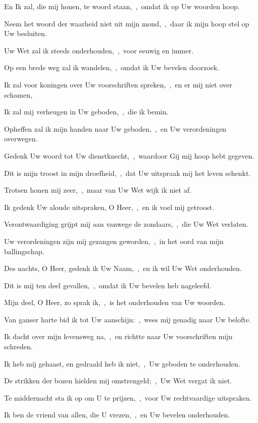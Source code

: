 \documentclass[12pt,twoside,a5paper]{article}
\begin{document}
\begin{halfparskip}
  En Ik zal, die mij honen, te woord staan,~\sep\ omdat ik op Uw woorden hoop.

  Neem het woord der waarheid niet uit mijn mond,~\sep\ daar ik mijn hoop stel op Uw besluiten.

  Uw Wet zal ik steeds onderhouden,~\sep\ voor eeuwig en immer.

  Op een brede weg zal ik wandelen,~\sep\ omdat ik Uw bevelen doorzoek.

  Ik zal voor koningen over Uw voorschriften spreken,~\sep\ en er mij niet over schamen,

  Ik zal mij verheugen in Uw geboden,~\sep\ die ik bemin.

  Opheffen zal ik mijn handen naar Uw geboden,~\sep\ en Uw verordeningen overwegen.

   Gedenk Uw woord tot Uw dienstknecht,~\sep\ waardoor Gij mij hoop hebt gegeven.

  Dit is mijn troost in mijn droefheid,~\sep\ dat Uw uitspraak mij het leven schenkt.

  Trotsen honen mij zeer,~\sep\ maar van Uw Wet wijk ik niet af.

  Ik gedenk Uw aloude uitspraken, O Heer,~\sep\ en ik voel mij getroost.

  Verontwaardiging grijpt mij aan vanwege de zondaars,~\sep\ die Uw Wet verlaten.

  Uw verordeningen zijn mij gezangen geworden,~\sep\ in het oord van mijn ballingschap.

  Des nachts, O Heer, gedenk ik Uw Naam,~\sep\ en ik wil Uw Wet onderhouden.

  Dit is mij ten deel gevallen,~\sep\ omdat ik Uw bevelen heb nageleefd.

   Mijn deel, O Heer, zo sprak ik,~\sep\ is het onderhouden van Uw woorden.

  Van ganser harte bid ik tot Uw aanschijn:~\sep\ wees mij genadig naar Uw belofte.

  Ik dacht over mijn levensweg na,~\sep\ en richtte naar Uw voorschriften mijn schreden.

  Ik heb mij gehaast, en gedraald heb ik niet,~\sep\ Uw geboden te onderhouden.

  De strikken der bozen hielden mij omstrengeld;~\sep\ Uw Wet vergat ik niet.

  Te middernacht sta ik op om U te prijzen,~\sep\ voor Uw rechtvaardige uitspraken.

  Ik ben de vriend van allen, die U vrezen,~\sep\ en Uw bevelen onderhouden.


\end{halfparskip}
\end{document}
